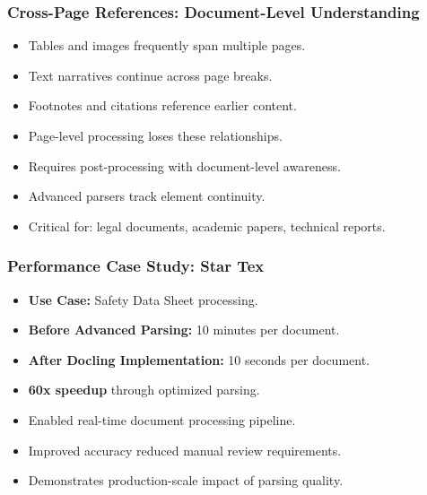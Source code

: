 \begin{frame}[fragile]\frametitle{Cross-Page References: Document-Level Understanding}
      \begin{itemize}
        \item Tables and images frequently span multiple pages.
        \item Text narratives continue across page breaks.
        \item Footnotes and citations reference earlier content.
        \item Page-level processing loses these relationships.
        \item Requires post-processing with document-level awareness.
        \item Advanced parsers track element continuity.
        \item Critical for: legal documents, academic papers, technical reports.
      \end{itemize}
\end{frame}

\begin{frame}[fragile]\frametitle{Performance Case Study: Star Tex}
      \begin{itemize}
        \item \textbf{Use Case:} Safety Data Sheet processing.
        \item \textbf{Before Advanced Parsing:} 10 minutes per document.
        \item \textbf{After Docling Implementation:} 10 seconds per document.
        \item \textbf{60x speedup} through optimized parsing.
        \item Enabled real-time document processing pipeline.
        \item Improved accuracy reduced manual review requirements.
        \item Demonstrates production-scale impact of parsing quality.
      \end{itemize}
\end{frame}

